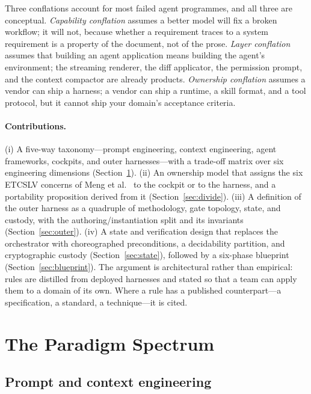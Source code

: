 \documentclass[10pt,a4paper]{article}
\theoremstyle{definition}
\theoremstyle{plain}
\theoremstyle{principle}
\begin{document}
Three conflations account for most failed agent programmes, and all three are conceptual.
\emph{Capability conflation} assumes a better model will fix a broken workflow; it will not,
because whether a requirement traces to a system requirement is a property of the document, not
of the prose. \emph{Layer conflation} assumes that building an agent application means building
the agent's environment; the streaming renderer, the diff applicator, the permission prompt, and
the context compactor are already products. \emph{Ownership conflation} assumes a vendor can ship
a harness; a vendor can ship a runtime, a skill format, and a tool protocol, but it cannot ship
your domain's acceptance criteria.

\paragraph{Contributions.} (i) A five-way taxonomy---prompt engineering, context engineering,
agent frameworks, cockpits, and outer harnesses---with a trade-off matrix over six engineering
dimensions (Section~\ref{sec:spectrum}). (ii) An ownership model that assigns the six ETCSLV
concerns of Meng et al.~\cite{meng2026} to the cockpit or to the harness, and a portability
proposition derived from it (Section~\ref{sec:divide}). (iii) A definition of the outer harness as
a quadruple of methodology, gate topology, state, and custody, with the authoring/instantiation
split and its invariants (Section~\ref{sec:outer}). (iv) A state and verification design that
replaces the orchestrator with choreographed preconditions, a decidability partition, and
cryptographic custody (Section~\ref{sec:state}), followed by a six-phase blueprint
(Section~\ref{sec:blueprint}). The argument is architectural rather than empirical: rules are
distilled from deployed harnesses and stated so that a team can apply them to a domain of its own.
Where a rule has a published counterpart---a specification, a standard, a technique---it is cited.

\section{The Paradigm Spectrum}\label{sec:spectrum}

\subsection{Prompt and context engineering}
\end{document}
